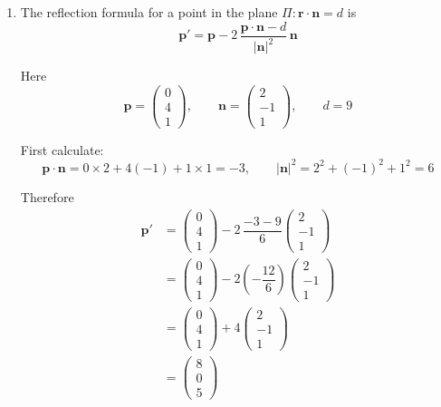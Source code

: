 \documentclass[leqno]{article}
\begin{document}
\begin{enumerate}[
  label=\textbf{\arabic*.},
  leftmargin=*,
  topsep=0pt,
  partopsep=0pt,
  parsep=0pt
]
\begin{djsSolution}
\begin{enumerate}[label=\textbf{(\alph*)}]
  \item The reflection formula for a point in the plane \(\Pi:\mathbf r\cdot\mathbf n=d\) is
  \[
  \mathbf p'
  =\mathbf p-2\,\dfrac{\mathbf p\cdot\mathbf n-d}{|\mathbf n|^2}\,\mathbf n
  \]

  Here
  \[
  \mathbf p=\begin{pmatrix}0\\4\\1\end{pmatrix},\qquad \mathbf n=\begin{pmatrix}2\\-1\\1\end{pmatrix},\qquad d=9
  \]

  First calculate:
  \[
  \mathbf p\cdot\mathbf n=0\times 2+4(-1)+1\times 1=-3,
  \qquad
  |\mathbf n|^2=2^2+(-1)^2+1^2=6
  \]

  Therefore
  \begin{align*}
  \mathbf p'
  &=\begin{pmatrix}0\\4\\1\end{pmatrix}-2\,\dfrac{-3-9}{6}\begin{pmatrix}2\\-1\\1\end{pmatrix}\\
  &=\begin{pmatrix}0\\4\\1\end{pmatrix}-2\left(-\dfrac{12}{6}\right)\begin{pmatrix}2\\-1\\1\end{pmatrix}\\
  &=\begin{pmatrix}0\\4\\1\end{pmatrix}+4\begin{pmatrix}2\\-1\\1\end{pmatrix}\\
  &=\begin{pmatrix}8\\0\\5\end{pmatrix}
  \end{align*}


\end{enumerate}
\end{djsSolution}
\end{enumerate}
\end{document}
